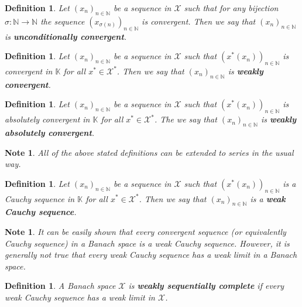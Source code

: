 \documentclass[a4paper, 12pt]{article}
\newtheorem{defin}[lem]{Definition}
\newtheorem{note}[lem]{Note}
\begin{document}
\begin{defin}\label{all:unconditionally-convergent} Let $(x_n)_{n \in \mathbb{N}}$ be a sequence in $\mathcal{X}$ such that for any bijection $\sigma \colon \mathbb{N} \to \mathbb{N}$ the sequence $(x_{\sigma(n)})_{n \in \mathbb{N}}$ is convergent. Then we say that $(x_n)_{n \in \mathbb{N}}$ is \textbf{unconditionally convergent}.
\end{defin}

\begin{defin}
Let $(x_n)_{n \in \mathbb{N}}$ be a sequence in $\mathcal{X}$ such that $(x^*(x_n))_{n \in \mathbb{N}}$ is convergent in $\mathbb{K}$ for all $x^* \in \mathcal{X}^*$. Then we say that $(x_n)_{n \in \mathbb{N}}$ is \textbf{weakly convergent}.
\end{defin}

\begin{defin} Let $(x_n)_{n \in \mathbb{N}}$ be a sequence in $\mathcal{X}$ such that $(x^*(x_n))_{n \in \mathbb{N}}$ is absolutely convergent in $\mathbb{K}$ for all $x^* \in \mathcal{X}^*$. The we say that $(x_n)_{n \in \mathbb{N}}$ is \textbf{weakly absolutely convergent}.
\end{defin}

\begin{note}\normalfont All of the above stated definitions can be extended to series in the usual way.
\end{note}

\begin{defin}Let $(x_n)_{n \in \mathbb{N}}$ be a sequence in $\mathcal{X}$ such that $(x^*(x_n))_{n \in \mathbb{N}}$ is a Cauchy sequence in $\mathbb{K}$ for all $x^* \in \mathcal{X}^*$. Then we say that $(x_n)_{n \in \mathbb{N}}$ is a \textbf{weak Cauchy sequence}.
\end{defin}

\begin{note}\normalfont It can be easily shown that every convergent sequence (or equivalently Cauchy sequence) in a Banach space is a weak Cauchy sequence. However, it is generally not true that every weak Cauchy sequence has a weak limit in a Banach space. \end{note}

\begin{defin}\label{def:weakly-seq-complete} A Banach space $\mathcal{X}$ is \textbf{weakly sequentially complete} if every weak Cauchy sequence has a weak limit in $\mathcal{X}$.
\end{defin}
\end{document}
